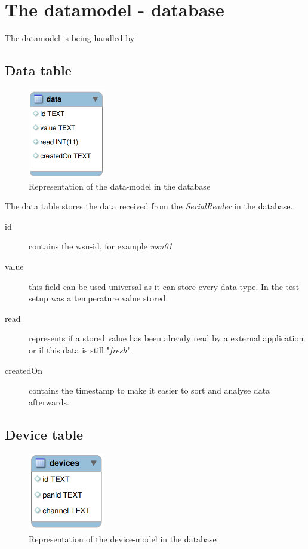 \newpage
\section{The datamodel - database}
The datamodel is being handled by 

\subsection{Data table}
\begin{figure}[H]
	\centering
	\includegraphics[width=0.3\textwidth]{pic/DatamodelData.png}%
    \caption{Representation of the data-model in the database}
    \label{DatamodelDatapic}%
\end{figure}

The data table stores the data received from the \textit{SerialReader} in the database.

\begin{description}
	\item[id] contains the wsn-id, for example \textit{wsn01}
	\item[value] this field can be used universal as it can store every data type. In the test setup was a temperature value stored.
	\item[read] represents if a stored value has been already read by a external application or if this data is still "\textit{fresh}".
	\item[createdOn] contains the timestamp to make it easier to sort and analyse data afterwards.
\end{description}

\newpage
\subsection{Device table}
\begin{figure}[H]
	\centering
	\includegraphics[width=0.3\textwidth]{pic/DatamodelDevices.png}%
    \caption{Representation of the device-model in the database}
    \label{DatamodelDevicespic}%
\end{figure}

